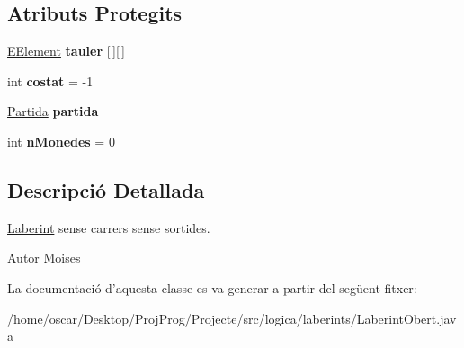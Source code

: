\subsection*{Atributs Protegits}
\begin{DoxyCompactItemize}
\item 
\hypertarget{classlogica_1_1laberints_1_1_laberint_obert_ad2c154b63d86f5dcbd23505ab2d34a0e}{\hyperlink{enumlogica_1_1enumeracions_1_1_e_element}{E\+Element} {\bfseries tauler} \mbox{[}$\,$\mbox{]}\mbox{[}$\,$\mbox{]}}\label{classlogica_1_1laberints_1_1_laberint_obert_ad2c154b63d86f5dcbd23505ab2d34a0e}

\item 
\hypertarget{classlogica_1_1laberints_1_1_laberint_obert_a33ecd1a8a59b8095ce3fb9088ee95388}{int {\bfseries costat} = -\/1}\label{classlogica_1_1laberints_1_1_laberint_obert_a33ecd1a8a59b8095ce3fb9088ee95388}

\item 
\hypertarget{classlogica_1_1laberints_1_1_laberint_obert_a32744ab9c4d5376b5d56583042ab1625}{\hyperlink{classlogica_1_1_partida}{Partida} {\bfseries partida}}\label{classlogica_1_1laberints_1_1_laberint_obert_a32744ab9c4d5376b5d56583042ab1625}

\item 
\hypertarget{classlogica_1_1laberints_1_1_laberint_obert_a744fb15a0442811d2a008a060daa2794}{int {\bfseries n\+Monedes} = 0}\label{classlogica_1_1laberints_1_1_laberint_obert_a744fb15a0442811d2a008a060daa2794}

\end{DoxyCompactItemize}


\subsection{Descripció Detallada}
\hyperlink{classlogica_1_1laberints_1_1_laberint}{Laberint} sense carrers sense sortides. 

\begin{DoxyAuthor}{Autor}
Moises 
\end{DoxyAuthor}


La documentació d'aquesta classe es va generar a partir del següent fitxer\+:\begin{DoxyCompactItemize}
\item 
/home/oscar/\+Desktop/\+Proj\+Prog/\+Projecte/src/logica/laberints/Laberint\+Obert.\+java\end{DoxyCompactItemize}
